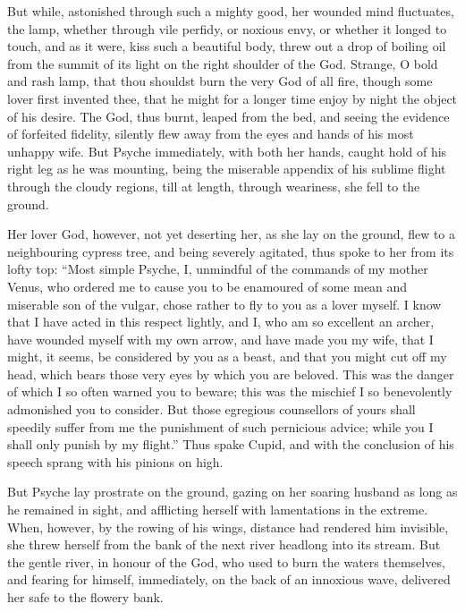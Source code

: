 \documentclass[12pt]{article}
\begin{document}
But while, astonished through such a mighty good, her wounded mind fluctuates,
the lamp, whether through vile perfidy, or noxious envy, or whether it longed
to touch, and as it were, kiss such a beautiful body, threw out a drop of
boiling oil from the summit of its light on the right shoulder of the God.
Strange, O bold and rash lamp, that thou shouldst burn the very God of all
fire, though some lover first invented thee, that he might for a longer time
enjoy by night the object of his desire. The God, thus burnt, leaped from the
bed, and seeing the evidence of forfeited fidelity, silently flew away from
the eyes and hands of his most unhappy wife. But Psyche immediately, with both
her hands, caught hold of his right leg as he was mounting, being the miserable
appendix of his sublime flight through the cloudy regions, till at length,
through weariness, she fell to the ground.

Her lover God, however, not yet deserting her, as she lay on the ground, flew
to a neighbouring cypress tree, and being severely agitated, thus spoke to her
from its lofty top: ``Most simple Psyche, I, unmindful of the commands of my
mother Venus, who ordered me to cause you to be enamoured of some mean and
miserable son of the vulgar, chose rather to fly to you as a lover myself. I
know that I have acted in this respect lightly, and I, who am so excellent an
archer, have wounded myself with my own arrow, and have made you my wife, that
I might, it seems, be considered by you as a beast, and that you might cut off
my head, which bears those very eyes by which you are beloved. This was the
danger of which I so often warned you to beware; this was the mischief I so
benevolently admonished you to consider. But those egregious counsellors of
yours shall speedily suffer from me the punishment of such pernicious advice;
while you I shall only punish by my flight.'' Thus spake Cupid, and with the
conclusion of his speech sprang with his pinions on high.

But Psyche lay prostrate on the ground, gazing on her soaring husband as long
as he remained in sight, and afflicting herself with lamentations in the
extreme. When, however, by the rowing of his wings, distance had rendered him
invisible, she threw herself from the bank of the next river headlong into its
stream. But the gentle river, in honour of the God, who used to burn the waters
themselves, and fearing for himself, immediately, on the back of an innoxious
wave, delivered her safe to the flowery bank.
\end{document}
